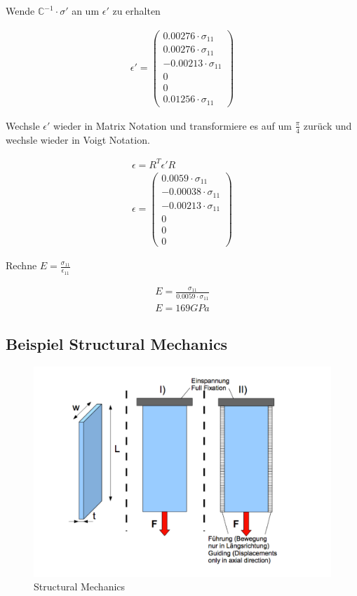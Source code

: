 \documentclass[a4paper]{scrartcl}
\begin{document}
Wende $\mathbb{C}^{-1} \cdot \sigma'$ an um $\epsilon'$ zu erhalten

\begin{align}
\epsilon'=\begin{pmatrix}
0.00276 \cdot \sigma_{11} \\
0.00276 \cdot \sigma_{11} \\
-0.00213 \cdot \sigma_{11} \\
0 \\
0 \\
0.01256 \cdot \sigma_{11}
\end{pmatrix}
\end{align}

Wechsle $\epsilon'$ wieder in Matrix Notation und transformiere es auf um
$\frac{\pi}{4}$ zurück und wechsle wieder in Voigt Notation.

\begin{align}
\epsilon=R^{T}\epsilon'R \\
\epsilon=\begin{pmatrix}
0.0059 \cdot \sigma_{11} \\
-0.00038 \cdot \sigma_{11} \\
-0.00213 \cdot \sigma_{11} \\
0 \\
0 \\
0
\end{pmatrix}
\end{align}

Rechne $E=\frac{\sigma_{11}}{\epsilon_{11}}$

\begin{align}
E=\frac{\sigma_{11}}{0.0059 \cdot \sigma_{11}} \\
E=169GPa
\end{align}

\subsection{Beispiel Structural Mechanics} %

\begin{figure}[h]
\begin{center}
\includegraphics[scale=0.3]{images/structural_mechanics.pdf}
\caption{Structural Mechanics}
\label{fig:structuralmechanics}
\end{center}
\end{figure}
\end{document}
